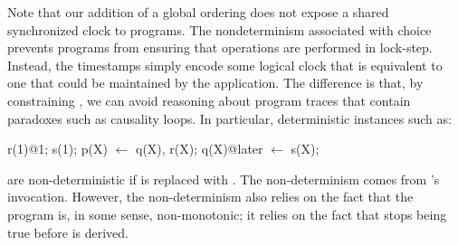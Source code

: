 Note that our addition of a global ordering does not expose a shared
synchronized clock to \lang programs.  The nondeterminism associated with
choice prevents programs from ensuring that operations are performed in
lock-step.  Instead, the timestamps simply encode some logical clock that is
equivalent to one that could be maintained by the application.  The difference
is that, by constraining , we can avoid reasoning about program
traces that contain paradoxes such as causality loops.  In particular,
deterministic instances such as:

\begin{Dedalus}
r(1)@1;
s(1);
p(X) \(\leftarrow\) q(X), r(X);
q(X)@later \(\leftarrow\) s(X);
\end{Dedalus}
are non-deterministic if  is replaced with
.  
The non-determinism comes from 's
 invocation.  However, the non-determinism also relies
on the fact that the program is, in some sense, non-monotonic; it
relies on the fact that  stops being true before
 is derived.










